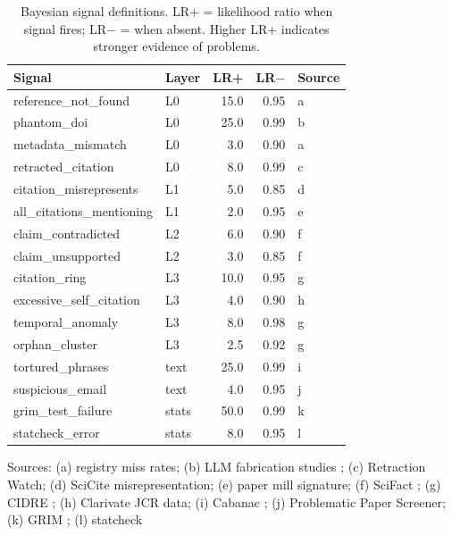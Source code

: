 \documentclass[sigconf,nonacm]{acmart}
\begin{document}
\begin{table}[t]
\caption{Bayesian signal definitions. LR+ = likelihood ratio when signal fires; LR$-$ = when absent. Higher LR+ indicates stronger evidence of problems.}
\label{tab:signals}
\centering
\small
\begin{tabular}{llrrl}
\toprule
\textbf{Signal} & \textbf{Layer} & \textbf{LR+} & \textbf{LR$-$} & \textbf{Source} \\
\midrule
reference\_not\_found     & L0    & 15.0  & 0.95 & a \\
phantom\_doi              & L0    & 25.0  & 0.99 & b \\
metadata\_mismatch        & L0    & 3.0   & 0.90 & a \\
retracted\_citation       & L0    & 8.0   & 0.99 & c \\
\midrule
citation\_misrepresents   & L1    & 5.0   & 0.85 & d \\
all\_citations\_mentioning & L1   & 2.0   & 0.95 & e \\
\midrule
claim\_contradicted       & L2    & 6.0   & 0.90 & f \\
claim\_unsupported        & L2    & 3.0   & 0.85 & f \\
\midrule
citation\_ring            & L3    & 10.0  & 0.95 & g \\
excessive\_self\_citation & L3    & 4.0   & 0.90 & h \\
temporal\_anomaly         & L3    & 8.0   & 0.98 & g \\
orphan\_cluster           & L3    & 2.5   & 0.92 & g \\
\midrule
tortured\_phrases         & text  & 25.0  & 0.99 & i \\
suspicious\_email         & text  & 4.0   & 0.95 & j \\
\midrule
grim\_test\_failure       & stats & 50.0  & 0.99 & k \\
statcheck\_error          & stats & 8.0   & 0.95 & l \\
\bottomrule
\end{tabular}
\vspace{2pt}
{\footnotesize Sources: (a) registry miss rates; (b) LLM fabrication studies \cite{alkaissi2023}; (c) Retraction Watch; (d) SciCite misrepresentation; (e) paper mill signature; (f) SciFact \cite{wadden2020fact}; (g) CIDRE \cite{kojaku2021}; (h) Clarivate JCR data; (i) Cabanac \cite{cabanac2021}; (j) Problematic Paper Screener; (k) GRIM \cite{brown2017grim}; (l) statcheck \cite{nuijten2016}}
\end{table}
\end{document}
